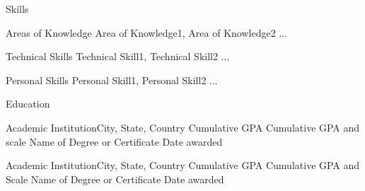 \documentclass[10pt, letterpaper]{article}
\begin{document}
    
    
    

    \begin{resumesection}{Skills}
        \begin{resumesubsection}{Areas of Knowledge}{}
            Area of Knowledge1, Area of Knowledge2 ...
        \end{resumesubsection}
        
        \begin{resumesubsection}{Technical Skills}{}
            Technical Skill1, Technical Skill2 ...
        \end{resumesubsection} 
        
        \begin{resumesubsection}{Personal Skills}{}
            Personal Skill1, Personal Skill2 ...
        \end{resumesubsection}
    \end{resumesection}
        
    \begin{resumesection}{Education}
        \begin{resumesubsection} {Academic Institution}{City, State, Country}
            Cumulative GPA \hfill Cumulative GPA and scale \newline
            Name of Degree or Certificate \hfill Date awarded           
        \end{resumesubsection}
        
        \begin{resumesubsection} {Academic Institution}{City, State, Country}
            Cumulative GPA \hfill Cumulative GPA and Scale \newline
            Name of Degree or Certificate \hfill Date awarded            
        \end{resumesubsection}
    \end{resumesection}
    
\end{document}
